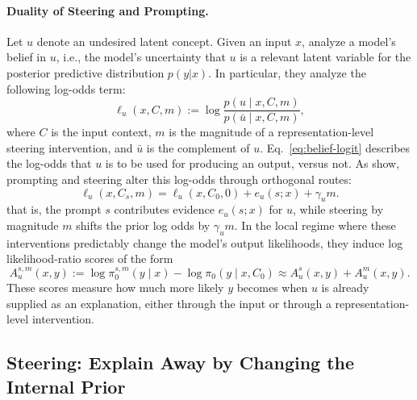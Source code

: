 \documentclass{article} %
\newcommand{\pizero}{\pi_0}
\newcommand{\Au}{A_u}
\newcommand{\Cs}{C_s}
\newcommand{\Czero}{C_0}
\begin{document}
\paragraph{Duality of Steering and Prompting.} Let $u$ denote an undesired latent concept. 
% 
Given an input $x$, \cite{bigelow2025belief} analyze a model's belief in $u$, i.e., the model's uncertainty that $u$ is a relevant latent variable for the posterior predictive distribution $p(y|x)$.
% 
In particular, they analyze the following log-odds term:
\begin{equation}
\label{eq:belief-logit}
    \ell_u(x,C,m) := \log \frac{p(u \mid x,C,m)}{p(\bar u \mid x,C,m)},
\end{equation}
where $C$ is the input context, $m$ is the magnitude of a representation-level steering intervention, and $\bar u$ is the complement of $u$. 
% 
Eq.~\ref{eq:belief-logit} describes the log-odds that $u$ is to be used for producing an output, versus not.
% 
As \cite{bigelow2025belief} show, prompting and steering alter this log-odds through orthogonal routes:
\begin{equation}
\label{eq:additive-beliefs}
    \ell_u(x,\Cs,m) = \ell_u(x,\Czero,0) + e_u(s;x) + \gamma_u m.
\end{equation}
% 
that is, the prompt $s$ contributes evidence $e_u(s;x)$ for $u$, while steering by magnitude $m$ shifts the prior log odds by $\gamma_u m$. 
% 
In the local regime where these interventions predictably change the model's output likelihoods, they induce log likelihood-ratio scores of the form
% 
\begin{equation}
\label{eq:additive-lr}
    \Au^{s,m}(x,y) := \log \pizero^{s,m}(y \mid x) - \log \pizero(y \mid x,\Czero) \approx \Au^s(x,y) + \Au^m(x,y).
\end{equation}
% 
These scores measure how much more likely $y$ becomes when $u$ is already supplied as an explanation, either through the input or through a representation-level intervention.

\subsection{Steering: Explain Away by Changing the Internal Prior}
\end{document}
